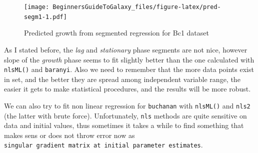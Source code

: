 \documentclass[]{book}
\newenvironment{Shaded}{\begin{snugshade}}{\end{snugshade}}
\newcommand{\KeywordTok}[1]{\textcolor[rgb]{0.13,0.29,0.53}{\textbf{#1}}}
\newcommand{\DataTypeTok}[1]{\textcolor[rgb]{0.13,0.29,0.53}{#1}}
\newcommand{\DecValTok}[1]{\textcolor[rgb]{0.00,0.00,0.81}{#1}}
\newcommand{\FloatTok}[1]{\textcolor[rgb]{0.00,0.00,0.81}{#1}}
\newcommand{\StringTok}[1]{\textcolor[rgb]{0.31,0.60,0.02}{#1}}
\newcommand{\OperatorTok}[1]{\textcolor[rgb]{0.81,0.36,0.00}{\textbf{#1}}}
\newcommand{\NormalTok}[1]{#1}
\theoremstyle{definition}
\theoremstyle{definition}
\theoremstyle{definition}
\theoremstyle{remark}
\begin{document}
\begin{figure}
\centering
\texttt{[image: BeginnersGuideToGalaxy\_files/figure-latex/pred-segm1-1.pdf]}
\caption{\label{fig:pred-segm1}Predicted growth from segmented regression
for Bc1 dataset}
\end{figure}

As I stated before, the \emph{lag} and \emph{stationary} phase segments
are not nice, however slope of the \emph{growth} phase seems to fit
slightly better than the one calculated with \texttt{nlsML()} and
\texttt{baranyi}. Also we need to remember that the more data points
exist in set, and the better they are spread among independent variable
range, the easier it gets to make statistical procedures, and the
results will be more robust.

We can also try to fit non linear regression for \texttt{buchanan} with
\texttt{nlsML()} and \texttt{nls2} (the latter with brute force).
Unfortunately, \texttt{nls} methods are quite sensitive on data and
initial values, thus sometimes it takes a while to find something that
makes sens or does not throw error now as
\texttt{singular\ gradient\ matrix\ at\ initial\ parameter\ estimates}.

\begin{Shaded}
\end{Shaded}
\end{document}
